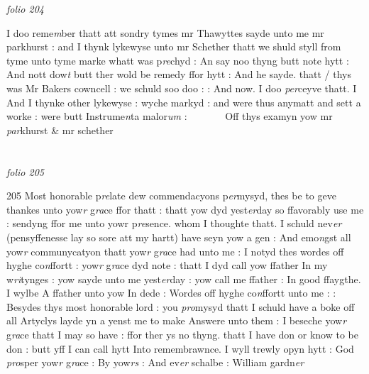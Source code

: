 \documentclass[12pt, a4paper]{book}
\begin{document}
\dotfill
					

\textit{folio 204}



				\marginpar[\vspace{0.5cm}{\textcolor{Gray}{md}}]{}
			 I doo reme\textit{m}ber thatt att sondry tymes mr Thawyttes sayde unto me 
			 mr parkhurst : and I thynk lykewyse unto mr Schether thatt we shuld styll from tyme unto tyme marke whatt was  p\textit{re}chyd : An say noo thyng butt note hytt : And nott 
			dow\textit{t}
               butt 
			ther wold be remedy ffor hytt : And he sayde. thatt / thys was  Mr Bakers cowncell : we schuld soo doo : : And now. I  doo \textit{per}ceyve thatt. I And I thynke other lykewyse : wyche markyd : and were thus anymatt and sett a worke : were butt Instrume\textit{n}ta malor\textit{um }:        Off thys examyn yow mr \textit{par}khurst \& mr schether

\dotfill
					  \section*{}

\textit{folio 205}



{\color{Mahogany}205} Most honorable p\textit{re}late dew commendacyons p\textit{er}mysyd, thes be to geve thankes unto yow\textit{r} g\textit{ra}ce ffor thatt : thatt yow dyd yest\textit{er}day so ffavorably use me : sendyng ffor me unto yowr p\textit{re}sence. whom I thoughte thatt. I schuld nev\textit{er} (pensyffenesse lay so sore att my hartt) have seyn yow a gen : And emo\textit{n}gst all yow\textit{r} communycatyon thatt yow\textit{r} g\textit{ra}ce had unto me : I notyd thes wordes off hyghe co\textit{n}ffortt : yow\textit{r} g\textit{ra}ce dyd note : thatt I dyd call yow  ffather In my w\textit{ri}tynges : yow sayde unto me yest\textit{er}day : yow call me ffather : In good ffaygthe. I wylbe A ffather unto yow In dede : Wordes off hyghe co\textit{n}ffortt unto me : : Besydes thys most honorable  lord : you \textit{pro}mysyd thatt I schuld have a boke off  all Artyclys layde yn a yenst me to make  Answere unto them : I beseche yow\textit{r} g\textit{ra}ce thatt I may so have : ffor ther ys no thyng. thatt I have don or know to be don : butt yff I can call hytt Into remembrawnce. I wyll trewly opyn hytt : God \textit{pro}sper yow\textit{r} g\textit{ra}ce : By yow\textit{rs} : And ev\textit{er}  schalbe : William gardn\textit{er}
               
\end{document}

